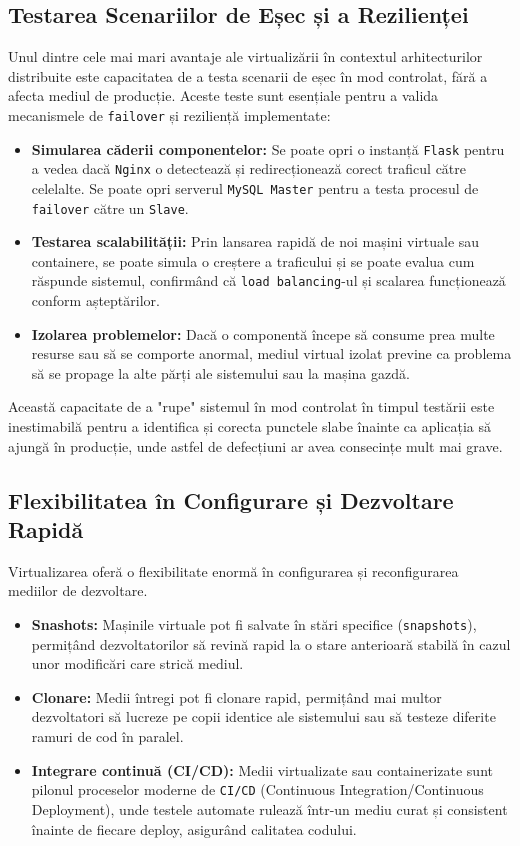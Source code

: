 \documentclass[12pt, a4paper, oneside, romanian]{teza-upb}
\begin{document}
\subsection{Testarea Scenariilor de Eșec și a Rezilienței}
Unul dintre cele mai mari avantaje ale virtualizării în contextul arhitecturilor distribuite este capacitatea de a testa scenarii de eșec în mod controlat, fără a afecta mediul de producție. Aceste teste sunt esențiale pentru a valida mecanismele de \texttt{failover} și reziliență implementate:
\begin{itemize}
	\item \textbf{Simularea căderii componentelor:} Se poate opri o instanță \texttt{Flask} pentru a vedea dacă \texttt{Nginx} o detectează și redirecționează corect traficul către celelalte. Se poate opri serverul \texttt{MySQL Master} pentru a testa procesul de \texttt{failover} către un \texttt{Slave}.
	\item \textbf{Testarea scalabilității:} Prin lansarea rapidă de noi mașini virtuale sau containere, se poate simula o creștere a traficului și se poate evalua cum răspunde sistemul, confirmând că \texttt{load balancing}-ul și scalarea funcționează conform așteptărilor.
	\item \textbf{Izolarea problemelor:} Dacă o componentă începe să consume prea multe resurse sau să se comporte anormal, mediul virtual izolat previne ca problema să se propage la alte părți ale sistemului sau la mașina gazdă.
\end{itemize}
Această capacitate de a "rupe" sistemul în mod controlat în timpul testării este inestimabilă pentru a identifica și corecta punctele slabe înainte ca aplicația să ajungă în producție, unde astfel de defecțiuni ar avea consecințe mult mai grave.

\subsection{Flexibilitatea în Configurare și Dezvoltare Rapidă}
Virtualizarea oferă o flexibilitate enormă în configurarea și reconfigurarea mediilor de dezvoltare.
\begin{itemize}
	\item \textbf{Snashots:} Mașinile virtuale pot fi salvate în stări specifice (\texttt{snapshots}), permițând dezvoltatorilor să revină rapid la o stare anterioară stabilă în cazul unor modificări care strică mediul.
	\item \textbf{Clonare:} Medii întregi pot fi clonare rapid, permițând mai multor dezvoltatori să lucreze pe copii identice ale sistemului sau să testeze diferite ramuri de cod în paralel.
	\item \textbf{Integrare continuă (CI/CD):} Medii virtualizate sau containerizate sunt pilonul proceselor moderne de \texttt{CI/CD} (Continuous Integration/Continuous Deployment), unde testele automate rulează într-un mediu curat și consistent înainte de fiecare deploy, asigurând calitatea codului.
\end{itemize}
\end{document}
